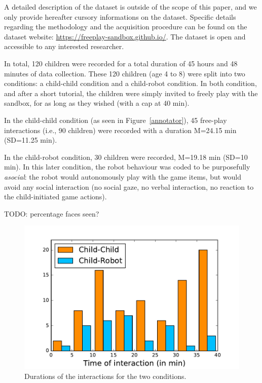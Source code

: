 \documentclass[sigconf]{acmart}
\newcommand{\ie}{i.e.,\xspace}
\begin{document}
A detailed description of the dataset is outside of the scope of this paper, and
we only provide hereafter cursory informations on the dataset. Specific details
regarding the methodology and the acquisition procedure can be found on the
dataset website: \url{https://freeplay-sandbox.github.io/}. The dataset is open and accessible
to any interested researcher.

In total, 120 children were recorded for a total duration of 45 hours and 48
minutes of data collection. These 120 children (age 4 to 8) were split into two
conditions: a child-child condition and a child-robot condition. In both
condition, and after a short tutorial, the children were simply invited to
freely play with the sandbox, for as long as they wished (with a cap at 40 min).

In the child-child condition (as seen in Figure~\ref{annotator}), 45 free-play interactions (\ie 90 children) were
recorded with a duration M=24.15 min (SD=11.25 min).

In the child-robot condition, 30 children were recorded, M=19.18 min (SD=10
min). In this later condition, the robot
behaviour was coded to be purposefully \emph{asocial}: the robot would autonomously play with
the game items, but would avoid any social interaction (no social gaze, no
verbal interaction, no reaction to the child-initiated game actions).

TODO: percentage faces seen?

\begin{figure}
    \centering
    \includegraphics[width=0.9\columnwidth]{durations}
    \caption{Durations of the interactions for the two conditions.}

    \label{fig|durations}
\end{figure}
\end{document}
